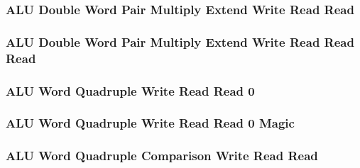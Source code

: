 \subsubsection[{\small ALU Double Word Pair Multiply Extend Write Read Read}]{ALU Double Word Pair Multiply Extend Write Read Read} \label{sec:format-ALU-DPMXWRR}



\subsubsection[{\small ALU Double Word Pair Multiply Extend Write Read Read Read}]{ALU Double Word Pair Multiply Extend Write Read Read Read} \label{sec:format-ALU-DPMXWRRR}



\subsubsection[{\small ALU Word Quadruple Write Read Read 0}]{ALU Word Quadruple Write Read Read 0} \label{sec:format-ALU-WQWRR0}



\subsubsection[{\small ALU Word Quadruple Write Read Read 0 Magic}]{ALU Word Quadruple Write Read Read 0 Magic} \label{sec:format-ALU-WQWRR0.M}



\subsubsection[{\small ALU Word Quadruple Comparison Write Read Read}]{ALU Word Quadruple Comparison Write Read Read} \label{sec:format-ALU-WQCWRR}



